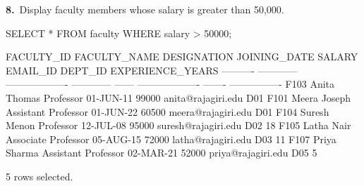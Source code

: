 \noindent\begin{minipage}{\linewidth}
\begingroup{}
{\fontsize{14}{17}\selectfont\textbf{8.}}\ Display faculty members whose salary is greater than 50,000.\par
\endgroup\vspace{12pt}


\begin{sqlcode}
SELECT * FROM faculty WHERE salary > 50000;
\end{sqlcode}

\vspace{18pt}


\begin{sqlout}[fontsize=\scriptsize]
FACULTY_ID  FACULTY_NAME  DESIGNATION          JOINING_DATE  SALARY  EMAIL_ID             DEPT_ID  EXPERIENCE_YEARS
----------  ------------  -------------------  ------------  ------  -------------------  -------  ----------------
F103        Anita Thomas  Professor            01-JUN-11      99000  anita@rajagiri.edu   D01
F101        Meera Joseph  Assistant Professor  01-JUN-22      60500  meera@rajagiri.edu   D01
F104        Suresh Menon  Professor            12-JUL-08      95000  suresh@rajagiri.edu  D02                    18
F105        Latha Nair    Associate Professor  05-AUG-15      72000  latha@rajagiri.edu   D03                    11
F107        Priya Sharma  Assistant Professor  02-MAR-21      52000  priya@rajagiri.edu   D05                     5

5 rows selected.
\end{sqlout}
\end{minipage}\par\vspace{24pt}

